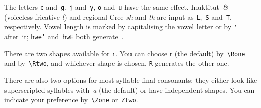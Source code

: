 \documentclass{article}
\begin{document}
The letters \texttt c and~\texttt g, \texttt j and~\texttt y,
\texttt o and~\texttt u have the same effect.
Inuktitut~\textit\& (voiceless fricative \textit l)
and regional Cree \textit{sh} and \textit{th}
are input as \texttt L,~\texttt S and~\texttt T, respectively.
Vowel length is marked by capitalising the vowel letter
or by \texttt' after~it; \texttt{hwe'} and~\texttt{hwE}
both generate~.

There are two shapes available for \texttt r. You can choose
\sylla r (the default) by~\verb!\Rone! and 
by~\verb!\Rtwo!, and whichever shape is chosen, \texttt R
generates the other one.

There are also two options for most syllable-final consonants:
they either look like superscripted syllables with~\textit a
(the default) or have independent shapes.  You can indicate
your preference by~\verb!\Zone! or~\verb!Ztwo!.
\end{document}
